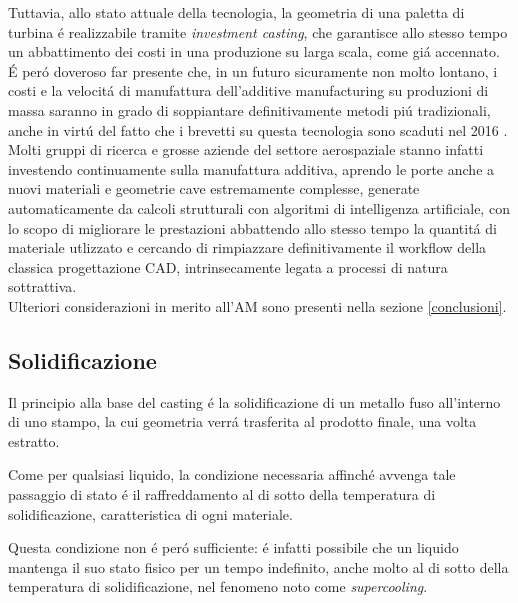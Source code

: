 \documentclass{article}
\begin{document}
    Tuttavia, allo stato attuale della tecnologia, la geometria di una paletta di turbina é realizzabile tramite
    \textit{investment casting}, che garantisce allo stesso tempo un abbattimento dei costi in una produzione
    su larga scala, come giá accennato.\\ 

    É peró doveroso far presente che, in un futuro sicuramente non molto lontano, i costi e la velocitá di manufattura
    dell'additive manufacturing su produzioni di massa saranno in grado di soppiantare definitivamente metodi piú tradizionali,
    anche in virtú del fatto che i brevetti su questa tecnologia sono scaduti nel 2016 \autocite{Latvian_additive}. 
    Molti gruppi di ricerca e grosse aziende del settore aerospaziale
    stanno infatti investendo continuamente sulla manufattura additiva,
    aprendo le porte anche a nuovi materiali e geometrie cave estremamente complesse, 
    generate automaticamente da calcoli strutturali con algoritmi di intelligenza artificiale, 
    con lo scopo di migliorare le prestazioni abbattendo allo stesso
    tempo la quantitá di materiale utlizzato e 
    cercando di rimpiazzare definitivamente il workflow della classica progettazione CAD, 
    intrinsecamente legata a processi di natura sottrattiva. \\ 

    Ulteriori considerazioni in merito all'AM sono presenti nella sezione \ref{conclusioni}.



    

    \clearpage

        \subsection{Solidificazione\label{Casting_solid}}

        Il principio alla base del casting é la solidificazione di un metallo fuso all'interno di uno
        stampo, la cui geometria verrá trasferita al prodotto finale, una volta estratto.

        Come per qualsiasi liquido, la condizione necessaria affinché
        avvenga tale passaggio di stato é il raffreddamento al di sotto della temperatura di solidificazione, 
        caratteristica di ogni materiale. 
        
        Questa condizione non é peró sufficiente: é infatti possibile che un liquido mantenga il suo 
        stato fisico per un tempo indefinito, anche molto al di sotto della temperatura di solidificazione, 
        nel fenomeno noto come \textit{supercooling}.
\end{document}
